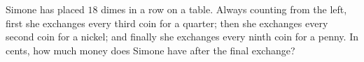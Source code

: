 Simone has placed $18$ dimes in a row on a table. Always counting from the left, first she exchanges every third coin for a quarter; then she exchanges every second coin for a nickel; and finally she exchanges every ninth coin for a penny. In cents, how much money does Simone have after the final exchange?
